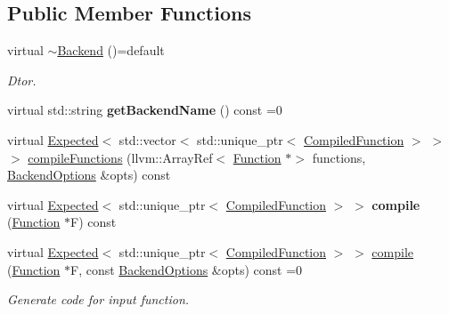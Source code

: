 \subsection*{Public Member Functions}
\begin{DoxyCompactItemize}
\item 
\mbox{\label{classglow_1_1_backend_a8a8bce197790fe3ac01f8c3d7697e608}} 
virtual \hyperlink{classglow_1_1_backend_a8a8bce197790fe3ac01f8c3d7697e608}{$\sim$\+Backend} ()=default
\begin{DoxyCompactList}\small\item\em Dtor. \end{DoxyCompactList}\item 
\mbox{\label{classglow_1_1_backend_a005575250ee6b4d2ceedf8905e023278}} 
virtual std\+::string {\bfseries get\+Backend\+Name} () const =0
\item 
virtual \hyperlink{classglow_1_1detail_1_1_glow_expected}{Expected}$<$ std\+::vector$<$ std\+::unique\+\_\+ptr$<$ \hyperlink{classglow_1_1_compiled_function}{Compiled\+Function} $>$ $>$ $>$ \hyperlink{classglow_1_1_backend_a23cf5c4fea89d0c34be2a3721a7f8f3f}{compile\+Functions} (llvm\+::\+Array\+Ref$<$ \hyperlink{classglow_1_1_function}{Function} $\ast$$>$ functions, \hyperlink{structglow_1_1_backend_options}{Backend\+Options} \&opts) const
\item 
\mbox{\label{classglow_1_1_backend_a1db744371c1c3a1d3d0c12607f1f9c61}} 
virtual \hyperlink{classglow_1_1detail_1_1_glow_expected}{Expected}$<$ std\+::unique\+\_\+ptr$<$ \hyperlink{classglow_1_1_compiled_function}{Compiled\+Function} $>$ $>$ {\bfseries compile} (\hyperlink{classglow_1_1_function}{Function} $\ast$F) const
\item 
virtual \hyperlink{classglow_1_1detail_1_1_glow_expected}{Expected}$<$ std\+::unique\+\_\+ptr$<$ \hyperlink{classglow_1_1_compiled_function}{Compiled\+Function} $>$ $>$ \hyperlink{classglow_1_1_backend_ab5f153ac5a6b2d1824f7a9c80ffc72f1}{compile} (\hyperlink{classglow_1_1_function}{Function} $\ast$F, const \hyperlink{structglow_1_1_backend_options}{Backend\+Options} \&opts) const =0
\begin{DoxyCompactList}\small\item\em Generate code for input function. \end{DoxyCompactList}\item 
$$
\end{DoxyCompactItemize}
